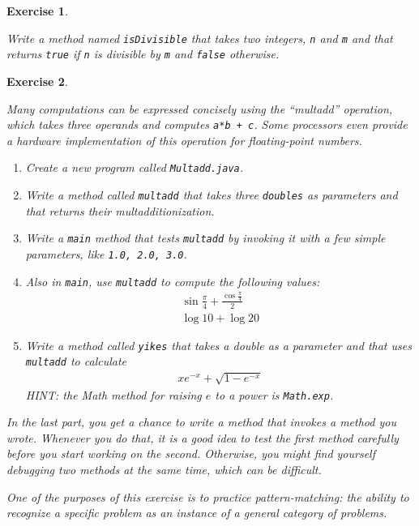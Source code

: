 \documentclass[12pt]{book}
\theoremstyle{exercise}
\newtheorem{exercise}{Exercise}[chapter]
\begin{document}
\begin{exercise}
\label{ex.isdiv}

Write a method named {\tt isDivisible} that takes
two integers, {\tt n} and {\tt m} and that returns {\tt true}
if {\tt n} is divisible by {\tt m} and {\tt false} otherwise.

\end{exercise}


\begin{exercise}
\label{ex.multadd}

Many computations can be expressed concisely using the ``multadd''
operation, which takes three operands and computes {\tt a*b + c}.  Some
processors even provide a hardware implementation of this operation for
floating-point numbers.

\begin{enumerate}

\item Create a new program called {\tt Multadd.java}.

\item Write a method called {\tt multadd} that takes three {\tt doubles}
as parameters and that returns their multadditionization.

\item Write a {\tt main} method that tests {\tt multadd} by invoking it with a
few simple parameters, like {\tt 1.0, 2.0, 3.0}.

\item Also in {\tt main}, use {\tt multadd} to compute the
following values:
%
\begin{eqnarray*}
& \sin \frac{\pi}{4} + \frac{\cos \frac{\pi}{4}}{2} & \\
& \log 10 + \log 20 &
\end{eqnarray*}
%
\item Write a method called {\tt yikes} that takes a
double as a parameter and that uses {\tt multadd} to calculate
%
\begin{eqnarray*}
x e^{-x} + \sqrt{1 - e^{-x}}
\end{eqnarray*}
%
HINT: the Math method for raising $e$ to a power is {\tt Math.exp}.

\end{enumerate}

In the last part, you get a chance to write a method that invokes
a method you wrote.  Whenever you do that, it is a good idea to
test the first method carefully before you start working on the
second.  Otherwise, you might find yourself debugging two methods
at the same time, which can be difficult.

One of the purposes of this exercise is to practice pattern-matching:
the ability to recognize a specific problem as an instance of a
general category of problems.

\end{exercise}
\end{document}
